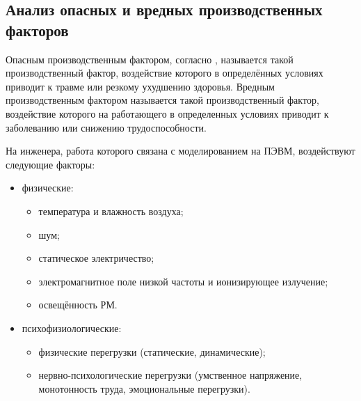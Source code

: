 \subsection{Анализ опасных и вредных производственных факторов}

Опасным производственным фактором, согласно \cite{Dahf2016}, называется такой производственный фактор, воздействие которого в определённых условиях приводит к травме или резкому ухудшению здоровья.
Вредным производственным фактором называется такой производственный фактор, воздействие которого на работающего в определенных условиях приводит к заболеванию или снижению трудоспособности.



На инженера, работа которого связана с моделированием на ПЭВМ, воздействуют следующие факторы:

\begin{itemize}
    \item физические:
    \begin{itemize}[leftmargin=+]
        \item температура и влажность воздуха;
        \item шум;
        \item статическое электричество;
        \item электромагнитное поле низкой частоты и ионизирующее излучение;
        \item освещённость РМ.
    \end{itemize}
    \item психофизиологические:
    \begin{itemize}[leftmargin=+]
        \item физические перегрузки (статические, динамические);
        \item нервно-психологические перегрузки (умственное напряжение, монотонность труда, эмоциональные перегрузки).
    \end{itemize}
\end{itemize}

